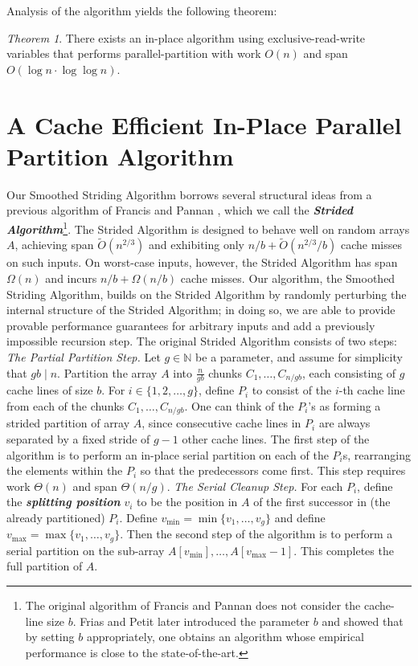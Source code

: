 \documentclass[sigconf, 10pt, nonacm]{acmart}
\newcommand{\defn}[1]{{\textit{\textbf{\boldmath #1}}}}
\renewcommand{\paragraph}[1]{\vspace{0.09in}\noindent{\bf \boldmath #1.}}
\theoremstyle{remark}
\newtheorem{theorem}{Theorem}[section]
\theoremstyle{remark}
\begin{document}
Analysis of the algorithm yields the following theorem:
\begin{theorem}
  \label{thminplace}
  There exists an in-place algorithm using exclusive-read-write
  variables that performs parallel-partition with work $O(n)$ and span
  $O(\log n \cdot \log \log n)$.
\end{theorem}

\section{A Cache Efficient In-Place Parallel Partition Algorithm}\label{sec:smoothing}

\paragraph{The Strided Algorithm \cite{FrancisPa92}}
Our Smoothed Striding Algorithm borrows several structural ideas from a
previous algorithm of Francis and Pannan \cite{FrancisPa92}, which we call the
\defn{Strided Algorithm}\footnote{The original algorithm of Francis and Pannan
  \cite{FrancisPa92} does not consider the cache-line size $b$. Frias and Petit
later introduced the parameter $b$ \cite{Frias08} and showed that by setting
$b$ appropriately, one obtains an algorithm whose empirical performance is
close to the state-of-the-art.}. The Strided Algorithm is designed to behave
well on random arrays $A$, achieving span $\tilde{O}(n^{2/3})$ and exhibiting
only $n/b + \tilde{O}(n^{2/3} / b)$  cache misses on such inputs. On worst-case
inputs, however, the Strided Algorithm has span $\Omega(n)$ and incurs $n/b +
\Omega(n/b)$ cache misses. Our algorithm, the Smoothed Striding Algorithm,
builds on the Strided Algorithm by randomly perturbing the internal structure
of the Strided Algorithm; in doing so, we are able to provide provable
performance guarantees for arbitrary inputs and add a previously impossible
recursion step.
The original Strided Algorithm consists of two steps: \\
\emph{The Partial Partition Step.} 
Let $g \in \mathbb{N}$ be a
parameter, and assume for simplicity that $gb \mid n$. Partition the
array $A$ into $\frac{n}{gb}$ chunks $C_1, \ldots, C_{n / gb}$,
each consisting of $g$ cache lines of size $b$.
For $i \in \{1, 2, \ldots, g\}$, define 
$P_i$ to consist of the $i$-th cache line from each of the
chunks $C_1, \ldots, C_{n / gb}$. One can think of the $P_i$'s
as forming a strided partition of array $A$, since
consecutive cache lines in $P_i$ are always separated by a fixed
stride of $g - 1$ other cache lines.
The first step of the algorithm is to perform an in-place serial
partition on each of the $P_i$s, rearranging the elements within the
$P_i$ so that the predecessors come first. This step requires work
$\Theta(n)$ and span $\Theta(n/g)$.
\emph{The Serial Cleanup Step. }
For each $P_i$, define the \defn{splitting position} $v_i$ to be the position
in $A$ of the first successor in (the already partitioned) $P_i$. Define
$v_{\text{min}} = \min\{v_1, \ldots, v_{g}\}$ and define $v_{\text{max}} =
\max\{v_1, \ldots, v_{g}\}$. Then the second step of the algorithm is to
perform a serial partition on the sub-array $A[v_{\text{min}}],\ldots,
A[v_{\text{max}}-1]$. This completes the full partition of $A$.
\end{document}

